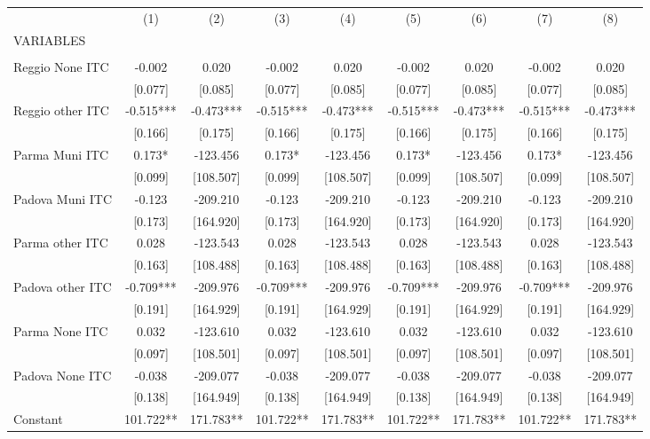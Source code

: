 \begin{tabular}{lcccccccc} \hline
 & (1) & (2) & (3) & (4) & (5) & (6) & (7) & (8) \\
VARIABLES &  &  &  &  &  &  &  &  \\ \hline
 &  &  &  &  &  &  &  &  \\
Reggio None ITC & -0.002 & 0.020 & -0.002 & 0.020 & -0.002 & 0.020 & -0.002 & 0.020 \\
 & [0.077] & [0.085] & [0.077] & [0.085] & [0.077] & [0.085] & [0.077] & [0.085] \\
Reggio other ITC & -0.515*** & -0.473*** & -0.515*** & -0.473*** & -0.515*** & -0.473*** & -0.515*** & -0.473*** \\
 & [0.166] & [0.175] & [0.166] & [0.175] & [0.166] & [0.175] & [0.166] & [0.175] \\
Parma Muni ITC & 0.173* & -123.456 & 0.173* & -123.456 & 0.173* & -123.456 & 0.173* & -123.456 \\
 & [0.099] & [108.507] & [0.099] & [108.507] & [0.099] & [108.507] & [0.099] & [108.507] \\
Padova Muni ITC & -0.123 & -209.210 & -0.123 & -209.210 & -0.123 & -209.210 & -0.123 & -209.210 \\
 & [0.173] & [164.920] & [0.173] & [164.920] & [0.173] & [164.920] & [0.173] & [164.920] \\
Parma other ITC & 0.028 & -123.543 & 0.028 & -123.543 & 0.028 & -123.543 & 0.028 & -123.543 \\
 & [0.163] & [108.488] & [0.163] & [108.488] & [0.163] & [108.488] & [0.163] & [108.488] \\
Padova other ITC & -0.709*** & -209.976 & -0.709*** & -209.976 & -0.709*** & -209.976 & -0.709*** & -209.976 \\
 & [0.191] & [164.929] & [0.191] & [164.929] & [0.191] & [164.929] & [0.191] & [164.929] \\
Parma None ITC & 0.032 & -123.610 & 0.032 & -123.610 & 0.032 & -123.610 & 0.032 & -123.610 \\
 & [0.097] & [108.501] & [0.097] & [108.501] & [0.097] & [108.501] & [0.097] & [108.501] \\
Padova None ITC & -0.038 & -209.077 & -0.038 & -209.077 & -0.038 & -209.077 & -0.038 & -209.077 \\
 & [0.138] & [164.949] & [0.138] & [164.949] & [0.138] & [164.949] & [0.138] & [164.949] \\
Constant & 101.722** & 171.783** & 101.722** & 171.783** & 101.722** & 171.783** & 101.722** & 171.783** \\

\end{tabular}
